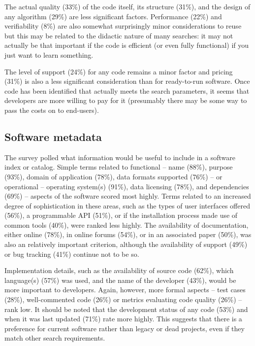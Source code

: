 \documentclass{casicswhitepaper}
\begin{document}
The actual quality (33\%) of the code itself, its structure (31\%), and the design of any algorithm (29\%) are less significant factors. Performance (22\%) and verifiability (8\%) are also somewhat surprisingly minor considerations to reuse but this may be related to the didactic nature of many searches: it may not actually be that important if the code is efficient (or even fully functional) if you just want to learn something.

The level of support (24\%) for any code remains a minor factor and pricing (31\%) is also a less significant consideration than for ready-to-run software. Once code has been identified that actually meets the search parameters, it seems that developers are more willing to pay for it (presumably there may be some way to pass the costs on to end-users).

\subsection{Software metadata}

The survey polled what information would be useful to include in a software index or catalog. Simple terms related to functional -- name (88\%), purpose (93\%), domain of application (78\%), data formats supported (76\%) -- or operational -- operating system(s) (91\%), data licensing (78\%), and dependencies (69\%) -- aspects of the software scored most highly. Terms related to an increased degree of sophistication in these areas, such as the types of user interfaces offered (56\%), a programmable API (51\%), or if the installation process made use of common tools (40\%), were ranked less highly. 
The availability of documentation, either online (78\%), in online forums (54\%), or in an associated paper (50\%), was also an relatively important criterion, although the availability of support (49\%) or bug tracking (41\%) continue not to be so. 

Implementation details, such as the availability of source code (62\%), which language(s) (57\%) was used, and the name of the developer (43\%), would be more important to developers. Again, however, more formal aspects -- test cases (28\%), well-commented code (26\%) or metrics evaluating code quality (26\%) -- rank low. It should be noted that the development status of any code (53\%) and when it was last updated (71\%) rate more highly. This suggests that there is a preference for current software rather than legacy or dead projects, even if they match other search requirements.
\end{document}
